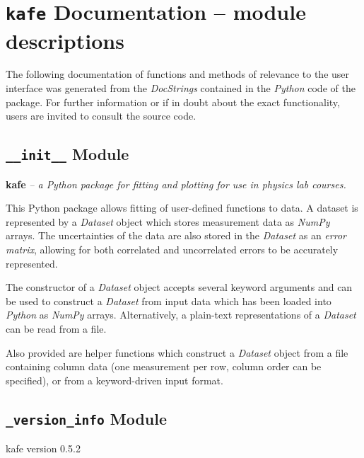 \documentclass[a4paper,10pt,english]{sphinxmanual}
\begin{document}
\chapter{\texttt{kafe} Documentation -- module descriptions}
\label{index:kafe-documentation-module-descriptions}
The following documentation of functions and methods
of relevance to the user interface was generated from
the \emph{DocStrings} contained in the \emph{Python} code of the
 package.
For further information or if in doubt about the exact
functionality, users are invited to consult the source
code.


\section{\texttt{\_\_init\_\_} Module}
\label{index:init-module}\label{index:module-kafe.__init__}
\textbf{kafe} \emph{-- a Python package for fitting and plotting for use in physics lab courses.}

This Python package allows fitting of user-defined functions to data. A dataset
is represented by a \emph{Dataset} object which stores measurement data as \emph{NumPy}
arrays. The uncertainties of the data are also stored in the \emph{Dataset} as an
\emph{error matrix}, allowing for both correlated and uncorrelated errors to be
accurately represented.

The constructor of a \emph{Dataset} object accepts several keyword arguments and can
be used to construct a \emph{Dataset} from input data which has been loaded into
\emph{Python} as \emph{NumPy} arrays. Alternatively, a plain-text representations of a
\emph{Dataset} can be read from a file.

Also provided are helper functions which construct a \emph{Dataset} object from a
file containing column data (one measurement per row, column order can be
specified), or from a keyword-driven input format.


\section{\texttt{\_version\_info} Module}
\label{index:module-kafe._version_info}\label{index:version-info-module}\label{index:module-__version_info}

\begin{fulllineitems}
\label{index:kafe._version_info.get_version}
kafe version 0.5.2

\end{fulllineitems}
\end{document}
